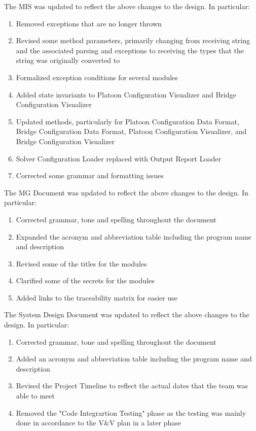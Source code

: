 \documentclass{article}
\begin{document}
\noindent The MIS was updated to reflect the above changes to the design. In particular:
\begin{enumerate}
  \item Removed exceptions that are no longer thrown
  \item Revised some method parameters, primarily changing from receiving string and the associated parsing and exceptions to receiving the types that the string was originally converted to
  \item Formalized exception conditions for several modules
  \item Added state invariants to Platoon Configuration Visualizer and Bridge Configuration Visualizer
  \item Updated methods, particularly for Platoon Configuration Data Format, Bridge Configuration Data Format, Platoon Configuration Visualizer, and Bridge Configuration Visualizer
  \item Solver Configuration Loader replaced with Output Report Loader
  \item Corrected some grammar and formatting issues
\end{enumerate}

\noindent The MG Document was updated to reflect the above changes to the design. In particular:
\begin{enumerate}
  \item Corrected grammar, tone and spelling throughout the document
  \item Expanded the acronym and abbreviation table including the program name and description
  \item Revised some of the titles for the modules 
  \item Clarified some of the secrets for the modules 
  \item Added links to the traceability matrix for easier use 
\end{enumerate}

\noindent The System Design Document was updated to reflect the above changes to the design. In particular:
\begin{enumerate}
  \item Corrected grammar, tone and spelling throughout the document
  \item Added an acronym and abbreviation table including the program name and description
  \item Revised the Project Timeline to reflect the actual dates that the team was able to meet
  \item Removed the "Code Integrartion Testing" phase as the testing was mainly done in accordance to the V\&V plan in a later phase 
\end{enumerate}
\end{document}
